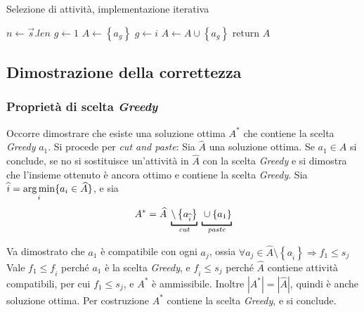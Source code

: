 \begin{algorithm}[H]
\caption{Selezione di attività, implementazione iterativa}\label{alg:asiter}
\begin{algorithmic}[1]
        \State $n \gets \vec{s}.len$
        \State $g \gets 1$
        \State $A \gets \left\{ a_g \right\}$
                \State $g \gets i$
                \State $A \gets A \cup \left\{ a_g \right\}$
            \EndIf
        \EndFor
        \State return $A$
    \EndProcedure
\end{algorithmic}
\end{algorithm}

\subsection{Dimostrazione della correttezza}

\subsubsection{Proprietà di scelta \emph{Greedy}}

Occorre dimostrare che esiste una soluzione ottima $A^*$ che contiene la scelta \emph{Greedy} ${a_1}$. Si procede per \emph{cut and paste}: Sia $\widehat{A}$ una soluzione ottima. Se ${a_1} \in \widehat{A}$ si conclude, se no si sostituisce un'attività in $\widehat{A}$ con la scelta \emph{Greedy} e si dimostra che l'insieme ottenuto è ancora ottimo e contiene la scelta \emph{Greedy}.
Sia $\widehat{i} =  \operatorname*{arg\,min}\limits_i \{ a_i \in \widehat{A} \} $, e sia
\[
A^* = \widehat{A} 
\;
\underbracket[1pt]{
\setminus \left\{ a_{\widehat{i}} \right\} 
}_{\text{\emph{cut}}}
\;
\underbracket[1pt]{
\vphantom{ \setminus \left\{ a_{\widehat{i}} \right\} }
\cup \left\{ a_1 \right\}
}_{\text{\emph{paste}}}
\]

Va dimostrato che $a_1$ è compatibile con ogni $a_j$, ossia 
$\forall a_j \in \widehat{A} \setminus \left\{ a_{\widehat{i}} \right\} \Rightarrow f_1 \leq s_j$
\\
Vale $f_1 \leq f_{\widehat{i}}$ perché $a_1$ è la scelta \emph{Greedy}, e $f_{\widehat{i}} \leq s_j$ perché $\widehat{A}$ contiene attività compatibili, per cui $f_1 \leq s_j$, e $A^*$ è ammissibile. Inoltre $|A^*| = |\widehat{A}|$, quindi è anche soluzione ottima. Per costruzione $A^*$ contiene la scelta \emph{Greedy}, e si conclude.


